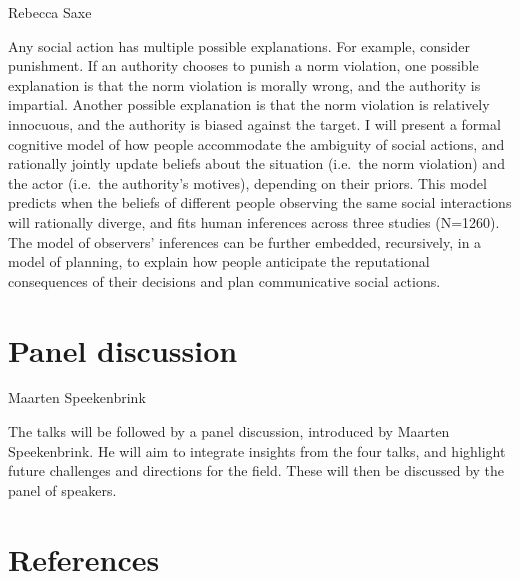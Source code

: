 \documentclass[10pt, letterpaper]{article}
\begin{document}
\begin{center}
Rebecca Saxe
\end{center}

Any social action has multiple possible explanations. For example,
consider punishment. If an authority chooses to punish a norm violation,
one possible explanation is that the norm violation is morally wrong,
and the authority is impartial. Another possible explanation is that the
norm violation is relatively innocuous, and the authority is biased
against the target. I will present a formal cognitive model of how
people accommodate the ambiguity of social actions, and rationally
jointly update beliefs about the situation (i.e.~the norm violation) and
the actor (i.e.~the authority's motives), depending on their priors.
This model predicts when the beliefs of different people observing the
same social interactions will rationally diverge, and fits human
inferences across three studies (N=1260). The model of observers'
inferences can be further embedded, recursively, in a model of planning,
to explain how people anticipate the reputational consequences of their
decisions and plan communicative social actions.

\hypertarget{panel-discussion}{%
\section{Panel discussion}\label{panel-discussion}}

\begin{center}
Maarten Speekenbrink
\end{center}

The talks will be followed by a panel discussion, introduced by Maarten
Speekenbrink. He will aim to integrate insights from the four talks, and
highlight future challenges and directions for the field. These will
then be discussed by the panel of speakers.

\hypertarget{references}{%
\section{References}\label{references}}

\setlength{\parindent}{-0.1in} 
\setlength{\leftskip}{0.125in}

\noindent

\small
\end{document}

